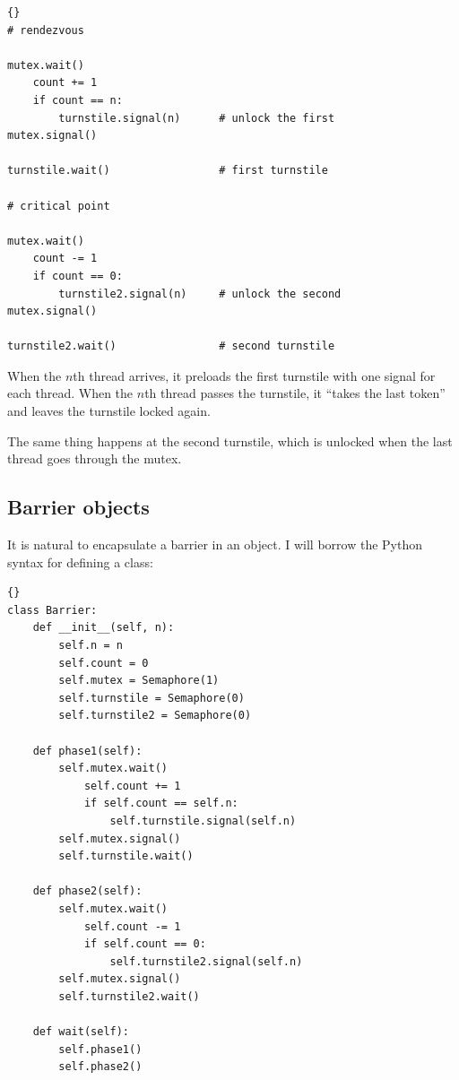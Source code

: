 \documentclass{book}
\begin{document}
\begin{latin}
\begin{latin}
\begin{lstlisting}[title={Reusable barrier solution}]{}
# rendezvous

mutex.wait()
    count += 1
    if count == n:
        turnstile.signal(n)      # unlock the first
mutex.signal()

turnstile.wait()                 # first turnstile

# critical point

mutex.wait()
    count -= 1
    if count == 0:
        turnstile2.signal(n)     # unlock the second
mutex.signal()

turnstile2.wait()                # second turnstile
\end{lstlisting}
\end{latin}
\end{latin}

When the $n$th thread arrives, it preloads the first turnstile with
one signal for each thread.  When the $n$th thread passes the
turnstile, it ``takes the last token'' and leaves the turnstile locked
again.

The same thing happens at the second turnstile, which is
unlocked when the last thread goes through the mutex.


\newpage
\subsection {Barrier objects}

It is natural to encapsulate a barrier in an object.  I will
borrow the Python syntax for defining a class:

\begin{latin}
\begin{latin}
\begin{lstlisting}[title={Barrier class}]{}
class Barrier:
    def __init__(self, n):
        self.n = n
        self.count = 0
        self.mutex = Semaphore(1)
        self.turnstile = Semaphore(0)
        self.turnstile2 = Semaphore(0)

    def phase1(self):
        self.mutex.wait()
            self.count += 1
            if self.count == self.n:
                self.turnstile.signal(self.n) 
        self.mutex.signal()
        self.turnstile.wait()            

    def phase2(self):
        self.mutex.wait()
            self.count -= 1
            if self.count == 0:
                self.turnstile2.signal(self.n)
        self.mutex.signal()
        self.turnstile2.wait()

    def wait(self):
        self.phase1()
        self.phase2()
\end{lstlisting}
\end{latin}
\end{latin}
\end{document}
